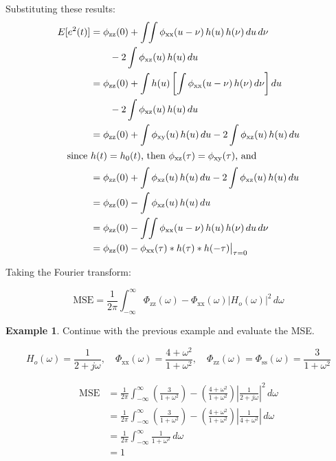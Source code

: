 \documentclass[12pt]{book}
\theoremstyle{definition}
\newtheorem{exmp}{Example}[chapter]
\begin{document}
Substituting these results:
\begin{align*}
E[e^2(t)] & = \phi_\mathrm{zz}(0)
              + \int\!\!\int \phi_\mathrm{xx}(u-\nu)\, h(u)\, h(\nu)\, du\, d\nu \\
           & \qquad - 2 \int \phi_\mathrm{xz}(u)\, h(u)\, du \\
           & = \phi_\mathrm{zz}(0)
              + \int h(u) \left[\int \phi_\mathrm{xx}(u-\nu)\, h(\nu)\, d\nu \right] du \\
           & \qquad - 2 \int \phi_\mathrm{xz}(u)\, h(u)\, du \\
           & = \phi_\mathrm{zz}(0)
              + \int \phi_\mathrm{xy}(u)\, h(u)\, du
              - 2 \int \phi_\mathrm{xz}(u)\, h(u)\, du \\
\intertext{\quad since $h(t) = h_0(t)$, then
           $\phi_\mathrm{xz}(\tau) = \phi_\mathrm{xy}(\tau)$, and}
           & = \phi_\mathrm{zz}(0)
              + \int \phi_\mathrm{xz}(u)\, h(u)\, du
              - 2 \int \phi_\mathrm{xz}(u)\, h(u)\, du \\
           & = \phi_\mathrm{zz}(0) - \int \phi_\mathrm{xz}(u)\, h(u)\, du \\
           & = \phi_\mathrm{zz}(0)
              - \int\!\!\int \phi_\mathrm{xx}(u-\nu)\, h(u)\, h(\nu)\, du\, d\nu \\
           & = \phi_\mathrm{zz}(0)
              - \phi_\mathrm{xx}(\tau) * h(\tau) * h(-\tau)\big|_{\tau=0}
\end{align*}

Taking the Fourier transform:

\[
\boxed{\text{MSE} = \frac{1}{2 \pi} \int_{-\infty}^\infty \Phi_\mathrm{zz}(\omega) - \Phi_\mathrm{xx}(\omega)|H_o(\omega)|^2  \, d \omega}
\]

\bigskip

\begin{tcolorbox}
\begin{exmp}{Continue with the previous example and evaluate the MSE.}
\end{exmp}
\end{tcolorbox}

\[
H_o(\omega) = \frac{1}{2+j \omega}, \quad \Phi_\mathrm{xx}(\omega) = \frac{4+\omega^2}{1+\omega^2}, \quad \Phi_\mathrm{zz}(\omega) = \Phi_\mathrm{ss}(\omega) = \frac{3}{1 + \omega^2}
\]

\[
\begin{aligned}    
\text{MSE} & = \frac{1}{2 \pi} \int_{-\infty}^\infty \left (\frac{3}{1 + \omega^2} \right )  - \left ( \frac{4+\omega^2}{1+\omega^2} \right) \left | \frac{1}{2+j \omega} \right |^2  \, d \omega \\
        & = \frac{1}{2 \pi} \int_{-\infty}^\infty \left (\frac{3}{1 + \omega^2} \right )  - \left ( \frac{4+\omega^2}{1+\omega^2} \right) \left | \frac{1}{4 + \omega^2} \right |  \, d \omega \\
        & = \frac{1}{2 \pi} \int_{-\infty}^\infty \frac{1}{1 + \omega^2 }\, d \omega\\
        & = 1
\end{aligned}
\]
\end{document}
